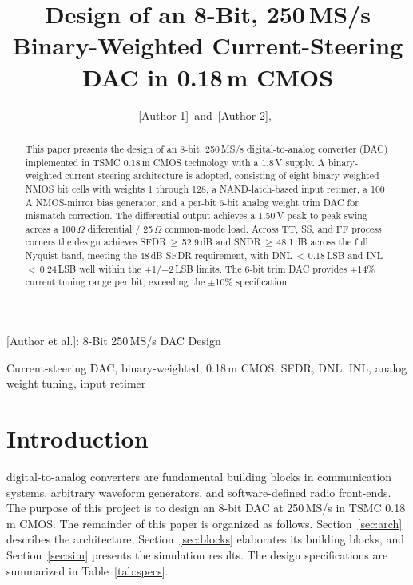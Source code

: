 \documentclass[lettersize,journal]{IEEEtran}
\begin{document}
\title{Design of an 8-Bit, 250\,MS/s Binary-Weighted Current-Steering DAC in 0.18\,\textmu m CMOS}

\author{[Author 1]~and~[Author 2],~
        }

%
{[Author et al.]: 8-Bit 250\,MS/s DAC Design}

\maketitle

\begin{abstract}
This paper presents the design of an 8-bit, 250\,MS/s digital-to-analog converter (DAC)
implemented in TSMC 0.18\,\textmu m CMOS technology with a 1.8\,V supply.
A binary-weighted current-steering architecture is adopted, consisting of eight
binary-weighted NMOS bit cells with weights 1 through 128, a NAND-latch-based
input retimer, a 100\,\textmu A NMOS-mirror bias generator, and a per-bit 6-bit
analog weight trim DAC for mismatch correction.
The differential output achieves a 1.50\,V peak-to-peak swing across a
100\,$\Omega$ differential / 25\,$\Omega$ common-mode load.
Across TT, SS, and FF process corners the design achieves
SFDR\,$\geq$\,52.9\,dB and SNDR\,$\geq$\,48.1\,dB across the full Nyquist band,
meeting the 48\,dB SFDR requirement, with DNL\,$<$\,0.18\,LSB and INL\,$<$\,0.24\,LSB
well within the $\pm$1/$\pm$2\,LSB limits.
The 6-bit trim DAC provides $\pm$14\% current tuning range per bit,
exceeding the $\pm$10\% specification.
\end{abstract}

\begin{IEEEkeywords}
Current-steering DAC, binary-weighted, 0.18\,\textmu m CMOS, SFDR, DNL, INL, analog weight tuning, input retimer
\end{IEEEkeywords}

\section{Introduction}
 digital-to-analog converters are fundamental building
blocks in communication systems, arbitrary waveform generators, and software-defined
radio front-ends. The purpose of this project is to design an 8-bit DAC at 250\,MS/s
in TSMC 0.18\,\textmu m CMOS. The remainder of this paper
is organized as follows. Section~\ref{sec:arch} describes the architecture,
Section~\ref{sec:blocks} elaborates its building blocks, and
Section~\ref{sec:sim} presents the simulation results.
The design specifications are summarized in Table~\ref{tab:specs}.
\end{document}
